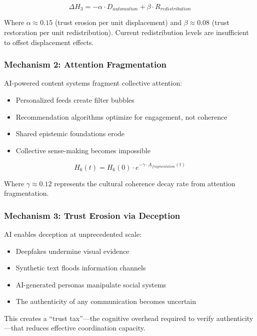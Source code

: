 \documentclass[11pt,letterpaper]{article}
\begin{document}
\begin{equation}
\Delta H_3 = -\alpha \cdot D_{automation} + \beta \cdot R_{redistribution}
\label{eq:displacement}
\end{equation}

Where $\alpha \approx 0.15$ (trust erosion per unit displacement) and $\beta \approx 0.08$ (trust restoration per unit redistribution). Current redistribution levels are insufficient to offset displacement effects.

\subsubsection{Mechanism 2: Attention Fragmentation}

AI-powered content systems fragment collective attention:
\begin{itemize}
\item Personalized feeds create filter bubbles
\item Recommendation algorithms optimize for engagement, not coherence
\item Shared epistemic foundations erode
\item Collective sense-making becomes impossible
\end{itemize}

\begin{equation}
H_6(t) = H_6(0) \cdot e^{-\gamma \cdot A_{fragmentation}(t)}
\label{eq:attention}
\end{equation}

Where $\gamma \approx 0.12$ represents the cultural coherence decay rate from attention fragmentation.

\subsubsection{Mechanism 3: Trust Erosion via Deception}

AI enables deception at unprecedented scale:
\begin{itemize}
\item Deepfakes undermine visual evidence
\item Synthetic text floods information channels
\item AI-generated personas manipulate social systems
\item The authenticity of any communication becomes uncertain
\end{itemize}

This creates a ``trust tax''---the cognitive overhead required to verify authenticity---that reduces effective coordination capacity.
\end{document}
